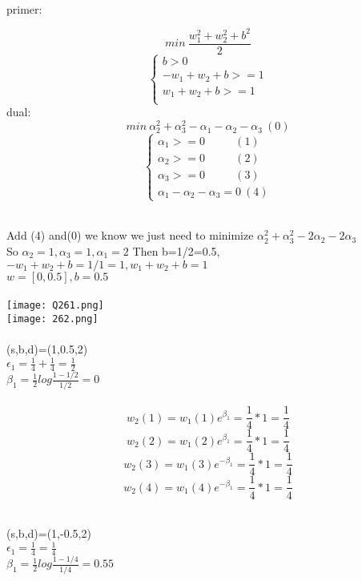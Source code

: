 \documentclass[11pt]{article}
\begin{document}
\\
	primer:
	
	$$min\ \frac{w_1^2+w_2^2+b^2}{2}$$
	\begin{equation}
	\begin{cases}
	b>0\\
	-w_1+w_2+b>=1\\
	w_1+w_2+b>=1\\
	\end{cases}
	\end{equation}
	dual:
	$$min\ \alpha_2^2+\alpha_3^2-\alpha_1-\alpha_2-\alpha_3\ (0)$$
	\begin{equation}
	\begin{cases}
	\alpha_1>=0\ \ \ \ \ \ \ \ \ \ \ \ (1)\\
	\alpha_2>=0\ \ \ \ \ \ \ \ \ \ \ \ (2)\\
	\alpha_3>=0\ \ \ \ \ \ \ \ \ \ \ \ (3)\\
	\alpha_1-\alpha_2-\alpha_3=0\ (4)
	\end{cases}
	\end{equation}

\\
	Add (4) and(0)  we know we just need to minimize $\alpha_2^2+\alpha_3^2-2\alpha_2-2\alpha_3$\\
	So $\alpha_2=1,\alpha_3=1,\alpha_1=2$
	Then b=1/2=0.5,$-w_1+w_2+b=1/1=1,w_1+w_2+b=1$\\
	$w=[0,0.5],b=0.5$\\
\\
		\texttt{[image: Q261.png]}\\
		\texttt{[image: 262.png]}\\

\\
	(s,b,d)=(1,0.5,2)\\
	$\epsilon_1=\frac{1}{4}+\frac{1}{4}=\frac{1}{2}$\\
	$\beta_1=\frac{1}{2}log{\frac{1-1/2}{1/2}}=0$\\
\\
	$$w_2(1)=w_1(1)e^{\beta_1}=\frac{1}{4}*1=\frac{1}{4}$$
	$$w_2(2)=w_1(2)e^{\beta_1}=\frac{1}{4}*1=\frac{1}{4}$$
	$$w_2(3)=w_1(3)e^{-\beta_1}=\frac{1}{4}*1=\frac{1}{4}$$
	$$w_2(4)=w_1(4)e^{-\beta_1}=\frac{1}{4}*1=\frac{1}{4}$$

\\
	(s,b,d)=(1,-0.5,2)\\
	$\epsilon_1=\frac{1}{4}=\frac{1}{4}$\\
	$\beta_1=\frac{1}{2}log{\frac{1-1/4}{1/4}}=0.55$\\
\end{document}
